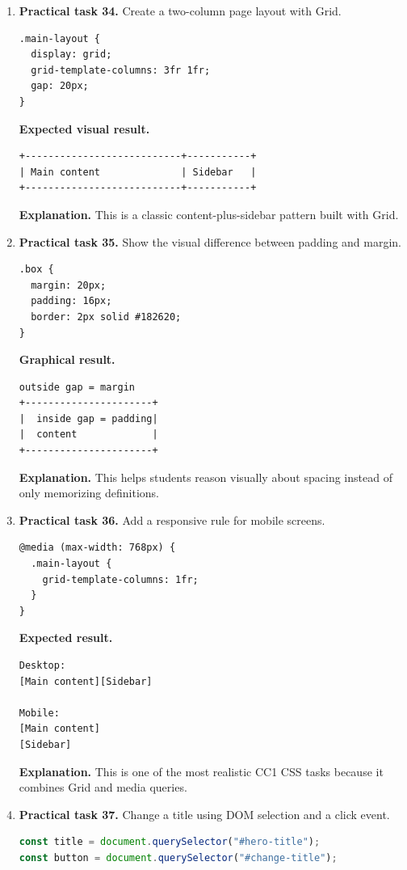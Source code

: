 \documentclass[11pt,a4paper]{article}
\begin{document}
\begin{enumerate}
  \item \textbf{Practical task 34.} Create a two-column page layout with Grid.
\begin{lstlisting}[style=code]
.main-layout {
  display: grid;
  grid-template-columns: 3fr 1fr;
  gap: 20px;
}
\end{lstlisting}
\textbf{Expected visual result.}
\begin{lstlisting}[style=terminal]
+---------------------------+-----------+
| Main content              | Sidebar   |
+---------------------------+-----------+
\end{lstlisting}
\textbf{Explanation.} This is a classic content-plus-sidebar pattern built with Grid.

  \item \textbf{Practical task 35.} Show the visual difference between padding and margin.
\begin{lstlisting}[style=code]
.box {
  margin: 20px;
  padding: 16px;
  border: 2px solid #182620;
}
\end{lstlisting}
\textbf{Graphical result.}
\begin{lstlisting}[style=terminal]
outside gap = margin
+----------------------+
|  inside gap = padding|
|  content             |
+----------------------+
\end{lstlisting}
\textbf{Explanation.} This helps students reason visually about spacing instead of only memorizing definitions.

  \item \textbf{Practical task 36.} Add a responsive rule for mobile screens.
\begin{lstlisting}[style=code]
@media (max-width: 768px) {
  .main-layout {
    grid-template-columns: 1fr;
  }
}
\end{lstlisting}
\textbf{Expected result.}
\begin{lstlisting}[style=terminal]
Desktop:
[Main content][Sidebar]

Mobile:
[Main content]
[Sidebar]
\end{lstlisting}
\textbf{Explanation.} This is one of the most realistic CC1 CSS tasks because it combines Grid and media queries.

  \item \textbf{Practical task 37.} Change a title using DOM selection and a click event.
\begin{lstlisting}[style=code, language=JavaScript]
const title = document.querySelector("#hero-title");
const button = document.querySelector("#change-title");


\end{lstlisting}
\end{enumerate}
\end{document}

